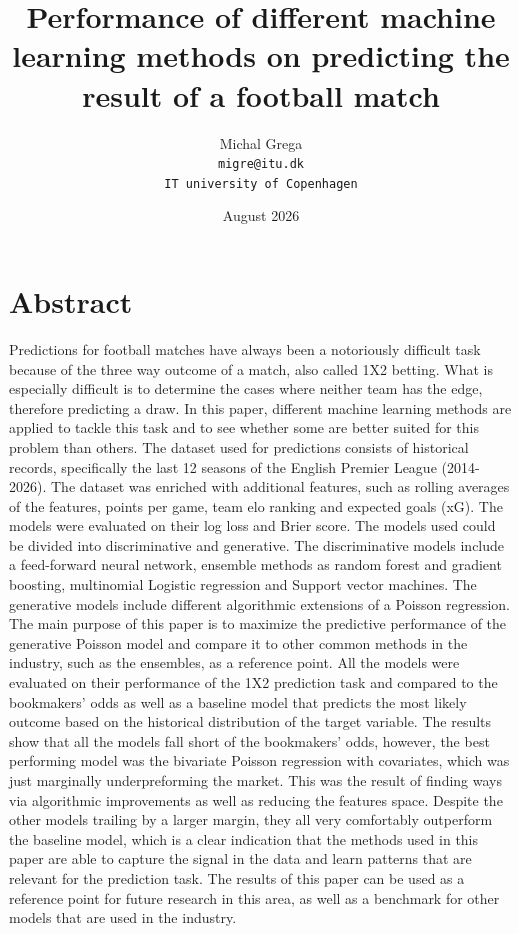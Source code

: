 \documentclass{article}
\title{Performance of different machine learning methods on predicting the result of a football match}
\author{Michal Grega \\
  \texttt{migre@itu.dk} \\
  \texttt{IT university of Copenhagen}}
\date{August 2026}
\begin{document}
\maketitle
\section*{Abstract}
Predictions for football matches have always been a notoriously difficult task because of the three way outcome of a match, also called 1X2 betting. What is especially difficult is to determine the cases where neither team has the edge, therefore predicting a draw. In this paper, different machine learning methods are applied to tackle this task and to see whether some are better suited for this problem than others. The dataset used for predictions consists of historical records, specifically the last 12 seasons of the English Premier League (2014-2026). The dataset was enriched with additional features, such as rolling averages of the features, points per game, team elo ranking and expected goals (xG). The models were evaluated on their log loss and Brier score. The models used could be divided into discriminative and generative. The discriminative models include a feed-forward neural network, ensemble methods as random forest and gradient boosting, multinomial Logistic regression and Support vector machines. The generative models include different algorithmic extensions of a Poisson regression. The main purpose of this paper is to maximize the predictive performance of the generative Poisson model and compare it to other common methods in the industry, such as the ensembles, as a reference point. All the models were evaluated on their performance of the 1X2 prediction task and compared to the bookmakers' odds as well as a baseline model that predicts the most likely outcome based on the historical distribution of the target variable. The results show that all the models fall short of the bookmakers' odds, however, the best performing model was the bivariate Poisson regression with covariates, which was just marginally underpreforming the market. This was the result of finding ways via algorithmic improvements as well as reducing the features space. Despite the other models trailing by a larger margin, they all very comfortably outperform the baseline model, which is a clear indication that the methods used in this paper are able to capture the signal in the data and learn patterns that are relevant for the prediction task. The results of this paper can be used as a reference point for future research in this area, as well as a benchmark for other models that are used in the industry.
\end{document}
